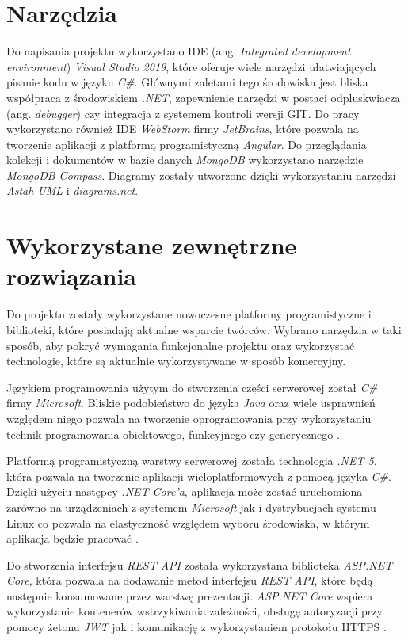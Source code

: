 \documentclass[a4paper,twoside,12pt]{book}
\newcommand{\obcy}[1]{\emph{#1}}
\newcommand{\ang}[1]{{\selectlanguage{british}\obcy{#1}}}
\begin{document}
{	\section{Narzędzia}
	Do napisania projektu wykorzystano IDE (ang. \ang{Integrated development environment}) \textit{Visual Studio 2019}, które oferuje wiele narzędzi ułatwiających pisanie kodu w języku \textit{C\#}. Głównymi zaletami tego środowiska jest bliska współpraca z środowiskiem \textit{.NET}, zapewnienie narzędzi w postaci odpluskwiacza (ang. \ang{debugger}) czy integracja z systemem kontroli wersji GIT. Do pracy wykorzystano również IDE \textit{WebStorm} firmy \textit{JetBrains}, które pozwala na tworzenie aplikacji z platformą programistyczną \textit{Angular}. Do przeglądania kolekcji i dokumentów w bazie danych \textit{MongoDB} wykorzystano narzędzie \textit{MongoDB Compass}. Diagramy zostały utworzone dzięki wykorzystaniu narzędzi \textit{Astah UML} i \textit{diagrams.net}.
	
	\section{Wykorzystane zewnętrzne rozwiązania}
	Do projektu zostały wykorzystane nowoczesne platformy programistyczne i biblioteki, które posiadają aktualne wsparcie twórców. Wybrano narzędzia w taki sposób, aby pokryć wymagania funkcjonalne projektu oraz wykorzystać technologie, które są aktualnie wykorzystywane w sposób komercyjny.
	
	Językiem programowania użytym do stworzenia części serwerowej został \textit{C\#} firmy \textit{Microsoft}. Bliskie podobieństwo do języka \textit{Java} oraz wiele usprawnień względem niego pozwala na tworzenie oprogramowania przy wykorzystaniu technik programowania obiektowego, funkcyjnego czy generycznego \cite{bib:csharp}.
	
	Platformą programistyczną warstwy serwerowej została technologia \textit{.NET 5}, która pozwala na tworzenie aplikacji wieloplatformowych z pomocą języka \textit{C\#}. Dzięki użyciu następcy \textit{.NET Core'a}, aplikacja może zostać uruchomiona zarówno na urządzeniach z systemem \textit{Microsoft} jak i dystrybucjach systemu Linux co pozwala na elastyczność względem wyboru środowiska, w którym aplikacja będzie pracować \cite{bib:dotnet5introduction}.
	
	Do stworzenia interfejsu \textit{REST API} została wykorzystana biblioteka \textit{ASP.NET Core}, która pozwala na dodawanie metod interfejsu \textit{REST API}, które będą następnie konsumowane przez warstwę prezentacji. \textit{ASP.NET Core} wspiera wykorzystanie kontenerów wstrzykiwania zależności, obsługę autoryzacji przy pomocy żetonu \textit{JWT} jak i komunikację z wykorzystaniem protokołu HTTPS \cite{bib:asp}.
	
}
\end{document}

